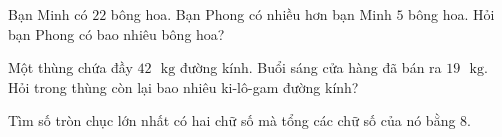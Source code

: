 \begin{bt}[1,5 điểm]
Bạn Minh có $22$ bông hoa. Bạn Phong có nhiều hơn bạn Minh $5$ bông hoa. Hỏi bạn Phong có bao nhiêu bông hoa?
\end{bt}

\begin{bt}[1,0 điểm]
Một thùng chứa đầy $42\text{ }\text{kg}$ đường kính. Buổi sáng cửa hàng đã bán ra $19\text{ }\text{kg}$. Hỏi trong thùng còn lại bao nhiêu ki-lô-gam đường kính?
\end{bt}

\begin{bt}[1,0 điểm]
Tìm số tròn chục lớn nhất có hai chữ số mà tổng các chữ số của nó bằng $8$.
\end{bt}
